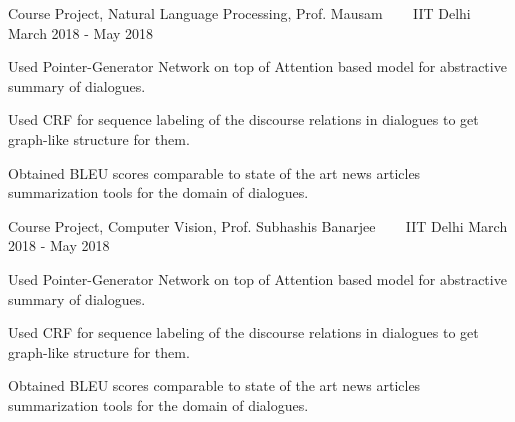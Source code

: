\begin{cventries}
  \cventry
  {Course Project, Natural Language Processing, Prof. Mausam}
  {\href{https://github.com/saketdingliwal/Abstractive-Dialogue-Summarization}{}
    \ \ \ \normalfont\href{https://github.com/saketdingliwal/Abstractive-Dialogue-Summarization}
    {}}
  {IIT Delhi}
  {March 2018 - May 2018}
  {
    \begin{cvitems}
    \item Used Pointer-Generator Network on top of Attention based model for abstractive summary of dialogues.
    \item Used CRF for sequence labeling of the discourse relations in dialogues to get graph-like structure for them.
    \item Obtained BLEU scores comparable to state of the art news articles summarization tools for the domain of dialogues.
    \end{cvitems}
  }
  
  \cventry
  {Course Project, Computer Vision, Prof. Subhashis Banarjee}
  {\href{https://github.com/saketdingliwal/Abstractive-Dialogue-Summarization}{}
    \ \ \ \normalfont\href{https://github.com/saketdingliwal/Abstractive-Dialogue-Summarization}
    {}}
  {IIT Delhi}
  {March 2018 - May 2018}
  {
    \begin{cvitems}
    \item Used Pointer-Generator Network on top of Attention based model for abstractive summary of dialogues.
    \item Used CRF for sequence labeling of the discourse relations in dialogues to get graph-like structure for them.
    \item Obtained BLEU scores comparable to state of the art news articles summarization tools for the domain of dialogues.
    \end{cvitems}
  }

\end{cventries}

